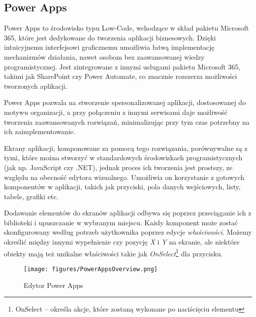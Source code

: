 \subsection{Power Apps}
Power Apps to środowisko typu Low-Code, wchodzące w skład pakietu Microsoft 365, które jest dedykowane do tworzenia aplikacji biznesowych. Dzięki intuicyjnemu interfejsowi graficznemu umożliwia łatwą implementację mechanizmów działania, nawet osobom bez zaawansowanej wiedzy programistycznej. Jest zintegrowane z innymi usługami pakietu Microsoft 365, takimi jak SharePoint czy Power Automate, co znacznie rozszerza możliwości tworzonych aplikacji.

Power Apps pozwala na stworzenie spersonalizowanej aplikacji, dostosowanej do motywu organizacji, a przy połączeniu z innymi serwisami daje możliwość tworzenia zaawansowanych rozwiązań, minimalizując przy tym czas potrzebny na ich zaimplementowanie.

Ekrany aplikacji, komponowane za pomocą tego rozwiązania, porównywalne są z tymi, które można stworzyć w standardowych środowiskach programistycznych (jak np. JavaScript czy .NET), jednak proces ich tworzenia jest prostszy, ze względu na obecność edytora wizualnego. Umożliwia on korzystanie z gotowych komponentów w aplikacji, takich jak przyciski, pola danych wejściowych, listy, tabele, grafiki etc.

Dodawanie elementów do ekranów aplikacji odbywa się poprzez przeciąganie ich z biblioteki i upuszczanie w wybranym miejscu. Każdy komponent może zostać skonfigurowany według potrzeb użytkownika poprzez edycje \emph{właściwości}. Możemy określić między innymi wypełnienie czy pozycję \emph{X} i \emph{Y} na ekranie, ale niektóre obiekty mają też unikalne właściwości takie jak \emph{OnSelect}\footnote{OnSelect -- określa akcje, które zostaną wykonane po naciścięciu elementu} dla przycisku.


\newpage

\begin{figure}[h]
    \centering
    \texttt{[image: figures/PowerAppsOverview.png]}
    \caption{Edytor Power Apps \cite{lancedmicrosoft_understand_2024}}
    \label{fig:PowerAppsEditorOverview}
\end{figure}



